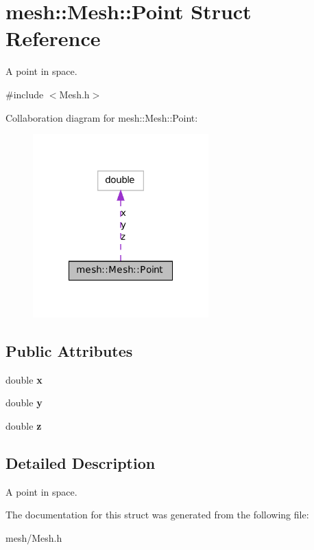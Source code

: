 \hypertarget{structmesh_1_1_mesh_1_1_point}{
\section{mesh::Mesh::Point Struct Reference}
\label{structmesh_1_1_mesh_1_1_point}
}


A point in space.  




{\ttfamily \#include $<$Mesh.h$>$}



Collaboration diagram for mesh::Mesh::Point:\nopagebreak
\begin{figure}[H]
\begin{center}
\leavevmode
\includegraphics[width=192pt]{structmesh_1_1_mesh_1_1_point__coll__graph}
\end{center}
\end{figure}
\subsection*{Public Attributes}
\begin{DoxyCompactItemize}
\item 
\hypertarget{structmesh_1_1_mesh_1_1_point_ae152ff4a904b2456fa625b4b88558d02}{
double {\bfseries x}}
\label{structmesh_1_1_mesh_1_1_point_ae152ff4a904b2456fa625b4b88558d02}

\item 
\hypertarget{structmesh_1_1_mesh_1_1_point_a04ba06eed96be76e338c9b03f4205e44}{
double {\bfseries y}}
\label{structmesh_1_1_mesh_1_1_point_a04ba06eed96be76e338c9b03f4205e44}

\item 
\hypertarget{structmesh_1_1_mesh_1_1_point_a8521a63f6c7f4ec8290b9e8f6205c410}{
double {\bfseries z}}
\label{structmesh_1_1_mesh_1_1_point_a8521a63f6c7f4ec8290b9e8f6205c410}

\end{DoxyCompactItemize}


\subsection{Detailed Description}
A point in space. 

The documentation for this struct was generated from the following file:\begin{DoxyCompactItemize}
\item 
mesh/Mesh.h\end{DoxyCompactItemize}
